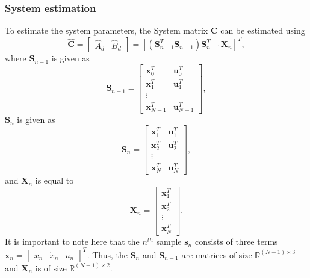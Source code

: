 \documentclass{article}
\begin{document}
\subsubsection{System estimation}
To estimate the system parameters, the System matrix $\mathbf{C}$ can be estimated using
\begin{equation}
\hat{\mathbf{C}} = \begin{bmatrix}\hat{A}_d & \hat{B}_d\end{bmatrix} = \left[ \left( \mathbf{S}_{n-1}^{T} \mathbf{S}_{n-1} \right) \mathbf{S}_{n-1}^{T} \mathbf{X}_{n} \right]^T,
\end{equation}
where $\mathbf{S}_{n-1}$ is given as
\begin{equation}
\mathbf{S}_{n-1} = 
\begin{bmatrix}
\mathbf{x}_0^T & \mathbf{u}_0^T \\
\mathbf{x}_1^T  & \mathbf{u}_1^T \\
\vdots \\
\mathbf{x}_{N-1}^T & \mathbf{u}_{N-1}^T
\end{bmatrix},
\end{equation}
$\mathbf{S}_{n}$ is given as
\begin{equation}
\mathbf{S}_{n} = 
\begin{bmatrix}
\mathbf{x}_1^T & \mathbf{u}_1^T \\
\mathbf{x}_2^T & \mathbf{u}_2^T  \\
\vdots \\
\mathbf{x}_{N}^T  & \mathbf{u}_N^T
\end{bmatrix},
\end{equation}
and $\mathbf{X}_{n}$ is equal to
\begin{equation}
\mathbf{X}_{n} = 
\begin{bmatrix}
\mathbf{x}_1^T \\
\mathbf{x}_2^T  \\
\vdots \\
\mathbf{x}_{N}^T 
\end{bmatrix}.
\end{equation}
It is important to note here that the $n^{th}$ sample $\mathbf{s}_{n}$ consists of three terms $\mathbf{x}_{n} = \begin{bmatrix} x_{n} & \dot{x}_{n} & u_n \end{bmatrix}^T$. Thus, the $\mathbf{S}_{n}$ and $\mathbf{S}_{n-1}$ are matrices of size $\mathbb{R}^{\left(N-1\right) \times 3}$ and $\mathbf{X}_{n}$ is of size $\mathbb{R}^{\left(N-1\right) \times 2}$.
\end{document}
